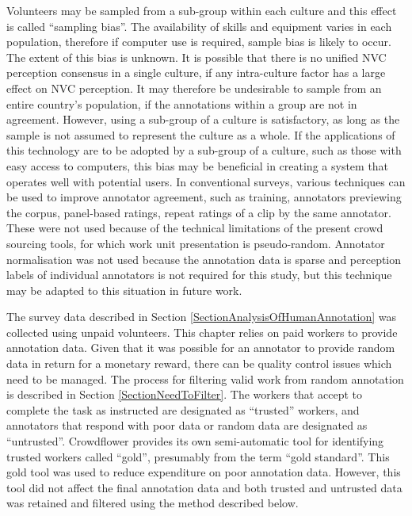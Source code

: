Volunteers may be sampled from a sub-group within each culture and this effect is called ``sampling bias''. 
The availability of skills and equipment varies in each population, therefore if computer use is required, sample bias is likely to occur. The extent of this bias is unknown. It is possible that there is no unified \ac{NVC} perception consensus in a single culture, if any intra-culture factor has a large effect on \ac{NVC} perception. It may therefore be undesirable to sample from an entire country's population, if the annotations within a group are not in agreement. However, using a sub-group of a culture is satisfactory, as long as the sample is not assumed to represent the culture as a whole. If the applications of this technology are to be adopted by a sub-group of a culture, such as those with easy access to computers, this bias may be beneficial in creating a system that operates well with potential users. In conventional surveys, various techniques can be used to improve annotator agreement, such as training, annotators previewing the corpus, panel-based ratings, repeat ratings of a clip by the same annotator. These were not used because of the technical limitations of the present crowd sourcing tools, for which work unit presentation is pseudo-random. Annotator normalisation was not used because the annotation data is sparse and  perception labels of individual annotators is not required for this study, but this technique may be adapted to this situation in future work.

The survey data described in Section \ref{SectionAnalysisOfHumanAnnotation} was collected using unpaid volunteers. This chapter relies on paid workers to provide annotation data. Given that it was possible for an annotator to provide random data in return for a monetary reward, there can be quality control issues which need to be managed. The process for filtering valid work from random annotation is described in Section \ref{SectionNeedToFilter}. The workers that accept to complete the task as instructed are designated as ``trusted'' workers, and annotators that respond with poor data or random data are designated as ``untrusted''. Crowdflower provides its own semi-automatic tool for identifying trusted workers called ``gold'', presumably from the term ``gold standard''. This gold tool was used to reduce expenditure on poor annotation data. However, this tool did not affect the final annotation data and both trusted and untrusted data was retained and filtered using the method described below.

